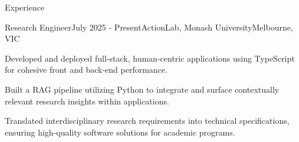 \documentclass[
	10pt, %
]{resume} %
\begin{document}
\begin{rSection}{Experience}

	\begin{rSubsection}{Research Engineer}{July 2025 - Present}{ActionLab, Monash University}{Melbourne, VIC}
        \item Developed and deployed full-stack, human-centric applications using TypeScript for cohesive front and back-end performance.
        \item Built a RAG pipeline utilizing Python to integrate and surface contextually relevant research insights within applications.
        \item Translated interdisciplinary research requirements into technical specifications, ensuring high-quality software solutions for academic programs.
	\end{rSubsection}






\end{rSection}
\end{document}
